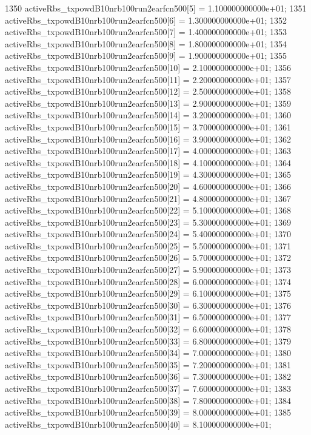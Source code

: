 \begin{DoxyCode}
1350   activeRbs\_txpowdB10nrb100run2earfcn500[5] = 1.100000000000e+01;
1351   activeRbs\_txpowdB10nrb100run2earfcn500[6] = 1.300000000000e+01;
1352   activeRbs\_txpowdB10nrb100run2earfcn500[7] = 1.400000000000e+01;
1353   activeRbs\_txpowdB10nrb100run2earfcn500[8] = 1.800000000000e+01;
1354   activeRbs\_txpowdB10nrb100run2earfcn500[9] = 1.900000000000e+01;
1355   activeRbs\_txpowdB10nrb100run2earfcn500[10] = 2.100000000000e+01;
1356   activeRbs\_txpowdB10nrb100run2earfcn500[11] = 2.200000000000e+01;
1357   activeRbs\_txpowdB10nrb100run2earfcn500[12] = 2.500000000000e+01;
1358   activeRbs\_txpowdB10nrb100run2earfcn500[13] = 2.900000000000e+01;
1359   activeRbs\_txpowdB10nrb100run2earfcn500[14] = 3.200000000000e+01;
1360   activeRbs\_txpowdB10nrb100run2earfcn500[15] = 3.700000000000e+01;
1361   activeRbs\_txpowdB10nrb100run2earfcn500[16] = 3.900000000000e+01;
1362   activeRbs\_txpowdB10nrb100run2earfcn500[17] = 4.000000000000e+01;
1363   activeRbs\_txpowdB10nrb100run2earfcn500[18] = 4.100000000000e+01;
1364   activeRbs\_txpowdB10nrb100run2earfcn500[19] = 4.300000000000e+01;
1365   activeRbs\_txpowdB10nrb100run2earfcn500[20] = 4.600000000000e+01;
1366   activeRbs\_txpowdB10nrb100run2earfcn500[21] = 4.800000000000e+01;
1367   activeRbs\_txpowdB10nrb100run2earfcn500[22] = 5.100000000000e+01;
1368   activeRbs\_txpowdB10nrb100run2earfcn500[23] = 5.300000000000e+01;
1369   activeRbs\_txpowdB10nrb100run2earfcn500[24] = 5.400000000000e+01;
1370   activeRbs\_txpowdB10nrb100run2earfcn500[25] = 5.500000000000e+01;
1371   activeRbs\_txpowdB10nrb100run2earfcn500[26] = 5.700000000000e+01;
1372   activeRbs\_txpowdB10nrb100run2earfcn500[27] = 5.900000000000e+01;
1373   activeRbs\_txpowdB10nrb100run2earfcn500[28] = 6.000000000000e+01;
1374   activeRbs\_txpowdB10nrb100run2earfcn500[29] = 6.100000000000e+01;
1375   activeRbs\_txpowdB10nrb100run2earfcn500[30] = 6.300000000000e+01;
1376   activeRbs\_txpowdB10nrb100run2earfcn500[31] = 6.500000000000e+01;
1377   activeRbs\_txpowdB10nrb100run2earfcn500[32] = 6.600000000000e+01;
1378   activeRbs\_txpowdB10nrb100run2earfcn500[33] = 6.800000000000e+01;
1379   activeRbs\_txpowdB10nrb100run2earfcn500[34] = 7.000000000000e+01;
1380   activeRbs\_txpowdB10nrb100run2earfcn500[35] = 7.200000000000e+01;
1381   activeRbs\_txpowdB10nrb100run2earfcn500[36] = 7.300000000000e+01;
1382   activeRbs\_txpowdB10nrb100run2earfcn500[37] = 7.600000000000e+01;
1383   activeRbs\_txpowdB10nrb100run2earfcn500[38] = 7.800000000000e+01;
1384   activeRbs\_txpowdB10nrb100run2earfcn500[39] = 8.000000000000e+01;
1385   activeRbs\_txpowdB10nrb100run2earfcn500[40] = 8.100000000000e+01;

\end{DoxyCode}
